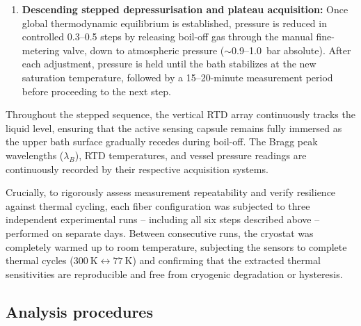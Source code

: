 \documentclass[preprint,11pt]{elsarticle}
\begin{document}
\begin{enumerate}
    \item \textbf{Descending stepped depressurisation and plateau acquisition:} 
    Once global thermodynamic equilibrium is established, pressure is reduced in controlled 0.3--0.5 steps by releasing boil-off gas through the manual fine-metering valve, down to atmospheric pressure ($\sim$0.9--1.0~bar absolute). After each adjustment, pressure is held until the bath stabilizes at the new saturation temperature, followed by a 15--20-minute measurement period before proceeding to the next step. 
\end{enumerate}

Throughout the stepped sequence, the vertical RTD array continuously tracks the liquid level, ensuring that the active sensing capsule remains fully immersed as the upper bath surface gradually recedes during boil-off. The Bragg peak wavelengths ($\lambda_B$), RTD temperatures, and vessel pressure readings are continuously recorded by their respective acquisition systems. 

Crucially, to rigorously assess measurement repeatability and verify resilience against thermal cycling, each fiber configuration was subjected to three independent experimental runs -- including all six steps described above --  performed on separate days. Between consecutive runs, the cryostat was completely warmed up to room temperature, subjecting the sensors to complete thermal cycles ($300~\text{K} \leftrightarrow 77~\text{K}$) and confirming that the extracted thermal sensitivities are reproducible and free from cryogenic degradation or hysteresis. 

\subsection{Analysis procedures}
\end{document}
